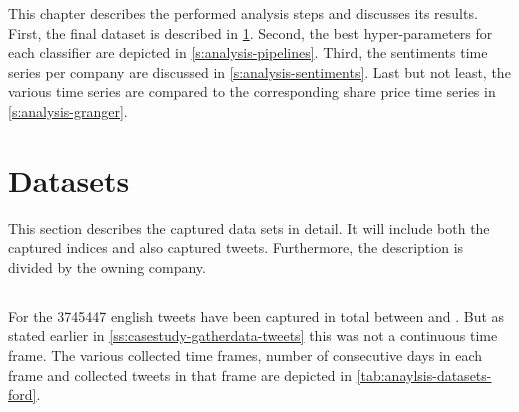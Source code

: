 


\newcommand{\indicesCaption}[1]{Indices of #1 within the evaluation time frame}
\newcommand{\resultsCaption}[1]{Normalized sentiment and share values of #1 within the evaluation time frame}
\newcommand{\sentimentsCaption}[1]{Summarized and normalized sentiment values of #1 within the evaluation time frame}
\newcommand{\tweetsCaption}[1]{Collection time frames of tweets for #1}
\newcommand{\confusionCaption}[1]{Confusion matrix of classifier #1}
\newcommand{\hyperCaption}[1]{Determined hyper-parameters for pipeline of classifier #1}
\newcommand{\oppositeCaption}[1]{Days with opposite sentiment values for the company #1}

This chapter describes the performed analysis steps and discusses its results.
First, the final dataset is described in \cref{s:analysis-datasets}.
Second, the best hyper-parameters for each classifier are depicted in \cref{s:analysis-pipelines}.
Third, the sentiments time series per company are discussed in \cref{s:analysis-sentiments}.
Last but not least, the various time series are compared to the corresponding share price time series in \cref{s:analysis-granger}.

\section{Datasets}
\label{s:analysis-datasets}

This section describes the captured data sets in detail.
It will include both the captured indices and also captured tweets.
Furthermore, the description is divided by the owning company.

\subsection{\ford}
\label{ss:analysis-datasets-ford}


For the \ford{} \num{3745447} english tweets have been captured in total between  and .
But as stated earlier in \cref{ss:casestudy-gatherdata-tweets} this was not a continuous time frame.
The various collected time frames, number of consecutive days in each frame and collected tweets in that frame are depicted in \cref{tab:anaylsis-datasets-ford}.

